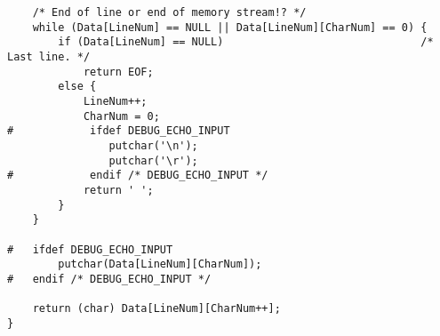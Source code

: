 \begin{verbatim}
    /* End of line or end of memory stream!? */
    while (Data[LineNum] == NULL || Data[LineNum][CharNum] == 0) {
        if (Data[LineNum] == NULL)                               /* Last line. */
            return EOF;
        else {
            LineNum++;
            CharNum = 0;
#            ifdef DEBUG_ECHO_INPUT
                putchar('\n');
                putchar('\r');
#            endif /* DEBUG_ECHO_INPUT */
            return ' ';
        }
    }

#   ifdef DEBUG_ECHO_INPUT
        putchar(Data[LineNum][CharNum]);
#   endif /* DEBUG_ECHO_INPUT */

    return (char) Data[LineNum][CharNum++];
}

\end{verbatim}
